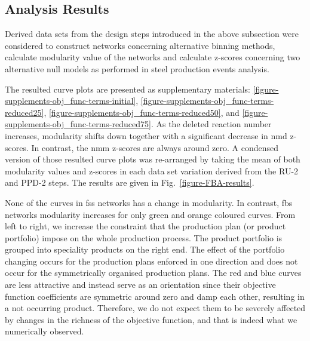 \subsection{Analysis Results}
Derived data sets from the design steps introduced in the above subsection were considered to construct networks concerning alternative binning methods, calculate modularity value of the networks and calculate z-scores concerning two alternative null models as performed in steel production events analysis.

The resulted curve plots are presented as supplementary materials: \ref{figure-supplements-obj_func-terms-initial}, \ref{figure-supplements-obj_func-terms-reduced25}, \ref{figure-supplements-obj_func-terms-reduced50}, and \ref{figure-supplements-obj_func-terms-reduced75}. As the deleted reaction number increases, modularity shifts down together with a significant decrease in \acs{nmd} z-scores. In contrast, the \acs{nmm} z-scores are always around zero. A condensed version of those resulted curve plots was re-arranged by taking the mean of both modularity values and z-scores in each data set variation derived from the RU-2 and PPD-2 steps. The results are given in Fig.~\ref{figure-FBA-results}.

None of the curves in \acs{fss} networks has a change in modularity. In contrast, \acs{fbs} networks modularity increases for only green and orange coloured curves. From left to right, we increase the constraint that the production plan (or product portfolio) impose on the whole production process. The product portfolio is grouped into speciality products on the right end. The effect of the portfolio changing occurs for the production plans enforced in one direction and does not occur for the symmetrically organised production plans. The red and blue curves are less attractive and instead serve as an orientation since their objective function coefficients are symmetric around zero and damp each other, resulting in a not occurring product. Therefore, we do not expect them to be severely affected by changes in the richness of the objective function, and that is indeed what we numerically observed.



